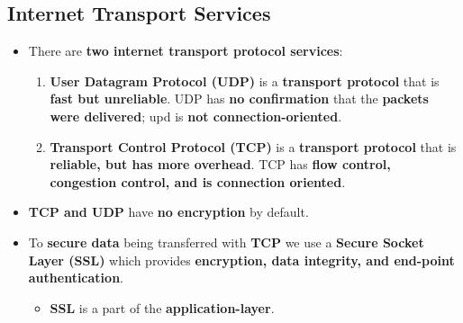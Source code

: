 \documentclass[16pt]{article}
\begin{document}
    \subsection*{Internet Transport Services}
    \begin{itemize}
        \item There are \textbf{two internet transport protocol services}:
        \begin{enumerate}
            \item \textbf{User Datagram Protocol (UDP)} is a \textbf{transport protocol} that is \textbf{fast but unreliable}. UDP has \textbf{no confirmation} that the \textbf{packets were delivered}; upd is \textbf{not connection-oriented}.
            \item \textbf{Transport Control Protocol (TCP)} is a \textbf{transport protocol} that is \textbf{reliable, but has more overhead}. TCP has \textbf{flow control, congestion control, and is connection oriented}.
        \end{enumerate}
        \item \textbf{TCP and UDP} have \textbf{no encryption} by default.
        \item To \textbf{secure data} being transferred with \textbf{TCP} we use a \textbf{Secure Socket Layer (SSL)} which provides \textbf{encryption, data integrity, and end-point authentication}.
        \begin{itemize}
            \item \textbf{SSL} is a part of the \textbf{application-layer}.
        \end{itemize}
    \end{itemize}
\end{document}
